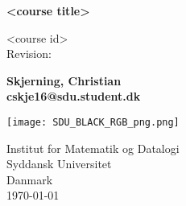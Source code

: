 \begin{titlepage}
	\begin{center}
    	\vspace*{1cm}
		\Huge
       	\textbf{<course title>}
 		
       	\vspace{5mm}
		\LARGE        
		<course id> \\
		\vspace{5mm}
		\normalsize
		Revision: %
 		
 		\normalsize
       	\vspace{15mm}
       	\textbf{Skjerning, Christian\\ cskje16@sdu.student.dk}
       	\vfill
 
       	\vspace{1.8cm}
       	\begin{center}
       		\texttt{[image: SDU\_BLACK\_RGB\_png.png]}
       	\end{center}
	 	\vspace{1.8cm}
	 	
	 	Institut for Matematik og Datalogi \\ Syddansk Universitet \\ Danmark \\
       	\today
 
   	\end{center}
\end{titlepage}